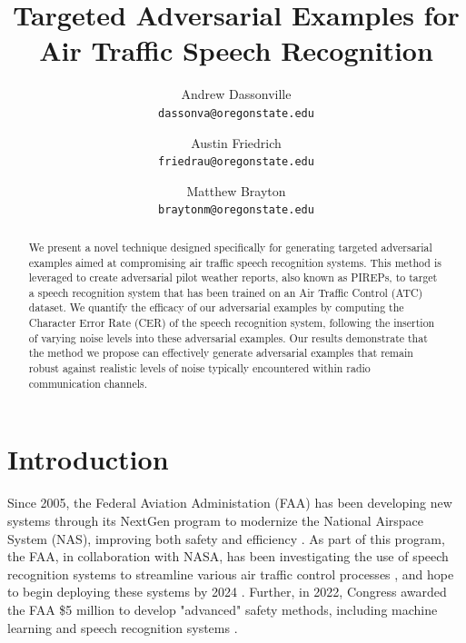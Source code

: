 \documentclass[11pt,a4paper]{article}
\begin{document}
\title{Targeted Adversarial Examples for Air Traffic Speech Recognition}

\author{
  Andrew Dassonville\\
  \texttt{dassonva@oregonstate.edu}
  \and
  Austin Friedrich\\
  \texttt{friedrau@oregonstate.edu}
  \and
  Matthew Brayton\\
  \texttt{braytonm@oregonstate.edu}
}

\maketitle

\thispagestyle{firstpage}

\begin{abstract}
  We present a novel technique designed specifically for generating targeted
  adversarial examples aimed at compromising air traffic speech recognition
  systems. This method is leveraged to create adversarial pilot weather reports,
  also known as PIREPs, to target a speech recognition system that has been
  trained on an Air Traffic Control (ATC) dataset. We quantify the efficacy of
  our adversarial examples by computing the Character Error Rate (CER) of the
  speech recognition system, following the insertion of varying noise levels
  into these adversarial examples. Our results demonstrate that the method we
  propose can effectively generate adversarial examples that remain robust
  against realistic levels of noise typically encountered within radio
  communication channels.
\end{abstract}

\section{Introduction}

Since 2005, the Federal Aviation Administation (FAA) has been developing new
systems through its NextGen program to modernize the National Airspace System
(NAS), improving both safety and efficiency \cite{web:faa_nextgen}. As part of
this program, the FAA, in collaboration with NASA, has been investigating the
use of speech recognition systems to streamline various air traffic control
processes \cite{nasa-2016-speech-recognition}, and hope to begin deploying these
systems by 2024 \cite{faa-2022-nextgen}. Further, in 2022, Congress awarded the
FAA \$5 million to develop "advanced" safety methods, including machine learning
and speech recognition systems \cite{faa-2022-budget}.
\end{document}
